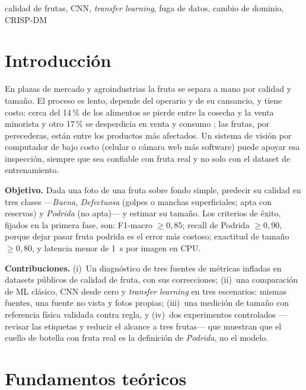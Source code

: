\documentclass[conference,a4paper]{IEEEtran}
\begin{document}
\begin{IEEEkeywords}
calidad de frutas, CNN, \emph{transfer learning}, fuga de datos, cambio de dominio, CRISP-DM
\end{IEEEkeywords}

\section{Introducción}

En plazas de mercado y agroindustrias la fruta se separa a mano por calidad y tamaño. El proceso es
lento, depende del operario y de su cansancio, y tiene costo: cerca del 14\,\% de los alimentos se
pierde entre la cosecha y la venta minorista \cite{fao2019} y otro 17\,\% se desperdicia en venta y
consumo \cite{unep2021}; las frutas, por perecederas, están entre los productos más afectados. Un
sistema de visión por computador de bajo costo (celular o cámara web más software) puede apoyar esa
inspección, siempre que sea confiable con fruta real y no solo con el dataset de entrenamiento.

\textbf{Objetivo.} Dada una foto de una fruta sobre fondo simple, predecir su calidad en tres clases
---\emph{Buena}, \emph{Defectuosa} (golpes o manchas superficiales; apta con reservas) y \emph{Podrida}
(no apta)--- y estimar su tamaño. Los criterios de éxito, fijados en la primera fase, son: F1-macro
$\geq 0{,}85$; recall de Podrida $\geq 0{,}90$, porque dejar pasar fruta podrida es el error más
costoso; exactitud de tamaño $\geq 0{,}80$, y latencia menor de 1~s por imagen en CPU.

\textbf{Contribuciones.} (i)~Un diagnóstico de tres fuentes de métricas infladas en datasets públicos
de calidad de fruta, con sus correcciones; (ii)~una comparación de ML clásico, CNN desde cero y
\emph{transfer learning} en tres escenarios: mismas fuentes, una fuente no vista y fotos propias;
(iii)~una medición de tamaño con referencia física validada contra regla, y (iv)~dos experimentos
controlados ---revisar las etiquetas y reducir el alcance a tres frutas--- que muestran que el cuello
de botella con fruta real es la definición de \emph{Podrida}, no el modelo.

\section{Fundamentos teóricos}
\end{document}
